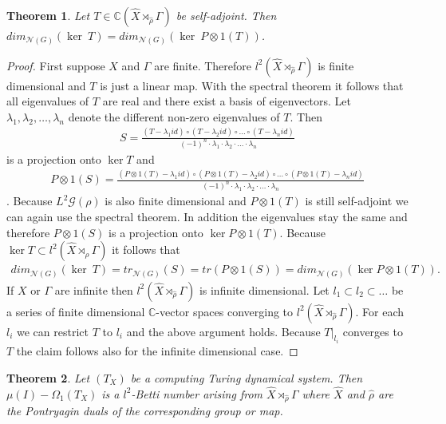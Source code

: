 \documentclass[12pt,a4paper]{scrartcl}
\newtheorem{Theorem}{Theorem}[section]
\numberwithin{equation}{section}
\newcommand{\C}{\mathbb{C}} %
\newcommand{\2}{\mathbb{Z} / 2 \mathbb{Z}}
\newcommand{\G}{\mathcal{G}}
\newcommand{\1}{\bar{1}}
\newcommand{\0}{\bar{0}}
\begin{document}
\begin{Theorem}
	Let $T \in \C(\hat{X} \rtimes_{\hat{\rho}} \Gamma)$ be self-adjoint. Then $dim_{\mathcal{N}(G)}(\ker \ T) = dim_{\mathcal{N}(G)}(\ker \ P \otimes 1(T))$.
\end{Theorem} \label{pontr}
\begin{proof}
	First suppose $X$ and $\Gamma$ are finite. Therefore $l^2(\hat{X} \rtimes_{\hat{\rho}} \Gamma)$ is finite dimensional and $T$ is just a linear map. With the spectral theorem it follows that all eigenvalues of $T$ are real and there exist a basis of eigenvectors. Let $\lambda_1, \lambda_2, \ldots, \lambda_n$ denote the different non-zero eigenvalues of $T$. Then
	\begin{align*}
		S = \frac{(T - \lambda_1 id) \circ (T - \lambda_2 id) \circ \ldots \circ (T - \lambda_n id)}{(-1)^n \cdot \lambda_1 \cdot \lambda_2 \cdot \ldots \cdot \lambda_n}
	\end{align*}
	is a projection onto $\ker T$ and 
	\begin{align*}
		P \otimes 1 (S) = \frac{(P \otimes 1(T) - \lambda_1 id) \circ (P \otimes 1(T) - \lambda_2 id) \circ \ldots \circ (P \otimes 1(T) - \lambda_n id)}{(-1)^n \cdot \lambda_1 \cdot \lambda_2 \cdot \ldots \cdot \lambda_n}
	\end{align*}.
	Because $L^2 \G (\rho)$ is also finite dimensional and $P \otimes 1(T)$ is still self-adjoint we can again use the spectral theorem. In addition the eigenvalues stay the same and therefore $P \otimes 1 (S)$ is a projection onto $\ker P \otimes 1 (T)$. Because $\ker T \subset l^2(\hat{X} \rtimes_{\hat{\rho}} \Gamma) $ it follows that
	\begin{align*}
		dim_{\mathcal{N}(G)}(\ker \ T) = tr_{\mathcal{N}(G)}(S) = tr(P \otimes 1 (S)) = dim_{\mathcal{N}(G)}(\ker P \otimes 1 (T)).
	\end{align*}
	If $X$ or $\Gamma$ are infinite then $l^2(\hat{X} \rtimes_{\hat{\rho}} \Gamma)$ is infinite dimensional. Let $l_1 \subset l_2 \subset \ldots$ be a series of finite dimensional $\C$-vector spaces converging to $l^2(\hat{X} \rtimes_{\hat{\rho}} \Gamma)$. For each $l_i$ we can restrict $T$ to $l_i$ and the above argument holds. Because $T|_{l_i}$ converges to $T$ the claim follows also for the infinite dimensional case.
\end{proof}
\begin{Theorem}
	Let $(T_X)$ be a computing Turing dynamical system. Then $\mu (I) - \Omega_1(T_X)$ is a $l^2$-Betti number arising from $\hat{X} \rtimes_{\hat{\rho}} \Gamma$ where $\hat{X}$ and $\hat{\rho}$ are the Pontryagin duals of the corresponding group or map.
\end{Theorem}
\end{document}
